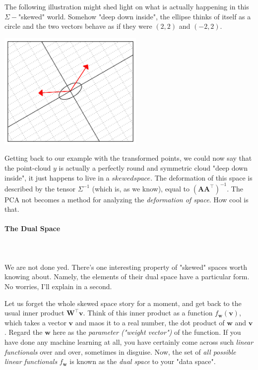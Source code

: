 \documentclass{article}
\begin{document}
The following illustration might shed light on what is actually happening in this $\Sigma-$"skewed" world. Somehow "deep down inside", the ellipse thinks of itself as a circle and the two vectors behave as if they were $(2,2)$ and $(-2,2)$.

\begin{center}
  \includegraphics[width=7cm]{figs_hints_5.png}
\end{center}

Getting back to our example with the transformed points, we could now say that the point-cloud $y$ is actually a perfectly round and symmetric cloud "deep down inside", it just happens to live in a $skewed space$. The deformation of this space is described by the tensor $\Sigma^{-1}$ (which is, as we know), equal to $\left(\bm{A}\bm{A}^{\intercal}\right)^{-1}$. The PCA not becomes a method for analyzing the \textit{deformation of space}. How cool is that.

\paragraph{The Dual Space}\mbox{}\\\\
We are not done yed. There's one interesting property of "skewed" spaces worth knowing about. Namely, the elements of their dual space have a particular form. No worries, I'll explain in a second. \medskip

Let us forget the whole skewed space story for a moment, and get back to the usual inner product $\bm{W}^{\intercal}\bm{v}$. Think of this inner product as a function $f_{\bm{w}}(\bm{v})$, which takes a vector $\bm{v}$ and maos it to a real number, the dot product of $\bm{w}$ and $\bm{v}$. Regard the $\bm{w}$  here as the \textit{parameter ("weight vector")} of the function. If you have done any machine learning at all, you have certainly come across such \textit{linear functionals} over and over, sometimes in disguise. Now, the set of \textit{all possible linear functionals} $f_{\bm{w}}$ is known as the \textit{dual space} to your "data space".\medskip
\end{document}
